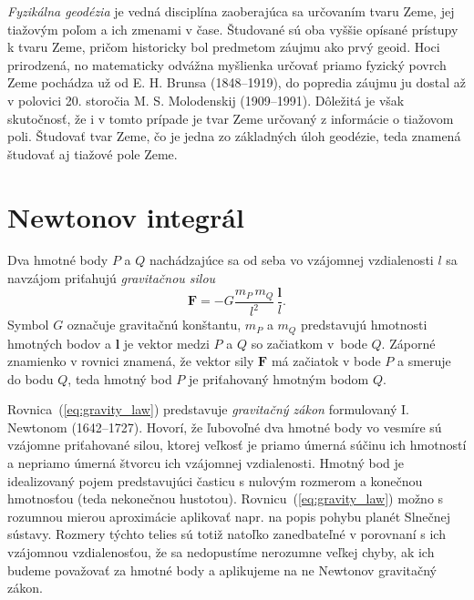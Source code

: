 \documentclass[a4paper, 12pt]{book}
\let\vec\mathbf
\begin{document}
\emph{Fyzikálna geodézia} je vedná disciplína zaoberajúca sa určovaním tvaru 
Zeme, jej tiažovým poľom a ich zmenami v čase.  Študované sú oba vyššie opísané 
prístupy k tvaru Zeme, pričom historicky bol predmetom záujmu ako prvý geoid.  
Hoci prirodzená, no matematicky odvážna myšlienka určovať priamo fyzický povrch 
Zeme pochádza už od E. H. Brunsa (1848--1919), do popredia záujmu ju dostal až 
v polovici 20. storočia M. S. Molodenskij (1909--1991).  Dôležitá je však 
skutočnosť, že i v tomto prípade je tvar Zeme určovaný z informácie o tiažovom 
poli.  Študovať tvar Zeme, čo je jedna zo základných úloh geodézie, teda 
znamená študovať aj tiažové pole Zeme.

\section{Newtonov integrál}


Dva hmotné body $P$ a $Q$ nachádzajúce sa od seba vo vzájomnej vzdialenosti $l$ 
sa navzájom priťahujú \emph{gravitačnou silou}
%
\begin{equation}
\label{eq:gravity_law}
\vec{F} = -G \frac{m_P \, m_Q}{l^2} \, \frac{\vec{l}}{l}{.}
\end{equation}
%
Symbol $G$ označuje gravitačnú konštantu, $m_P$ a $m_Q$ predstavujú hmotnosti 
hmotných bodov a $\vec l$ je vektor medzi $P$ a $Q$ so začiatkom v~bode $Q$.  
Záporné znamienko v rovnici znamená, že vektor sily $\vec F$ má začiatok v bode 
$P$ a smeruje do bodu $Q$, teda hmotný bod $P$ je priťahovaný hmotným bodom 
$Q$.

Rovnica~(\ref{eq:gravity_law}) predstavuje \emph{gravitačný zákon} formulovaný 
I. Newtonom (1642--1727).  Hovorí, že ľubovoľné dva hmotné body vo vesmíre sú 
vzájomne priťahované silou, ktorej veľkosť je priamo úmerná súčinu ich 
hmotností a nepriamo úmerná štvorcu ich vzájomnej vzdialenosti.  Hmotný bod je 
idealizovaný pojem predstavujúci časticu s nulovým rozmerom a konečnou 
hmotnosťou (teda nekonečnou hustotou).  Rovnicu~(\ref{eq:gravity_law}) možno 
s rozumnou mierou aproximácie aplikovať napr. na popis pohybu planét Slnečnej 
sústavy.  Rozmery týchto telies sú totiž natoľko zanedbateľné v porovnaní s ich 
vzájomnou vzdialenosťou, že sa nedopustíme nerozumne veľkej chyby, ak ich 
budeme považovať za hmotné body a aplikujeme na ne Newtonov gravitačný zákon.
\end{document}
